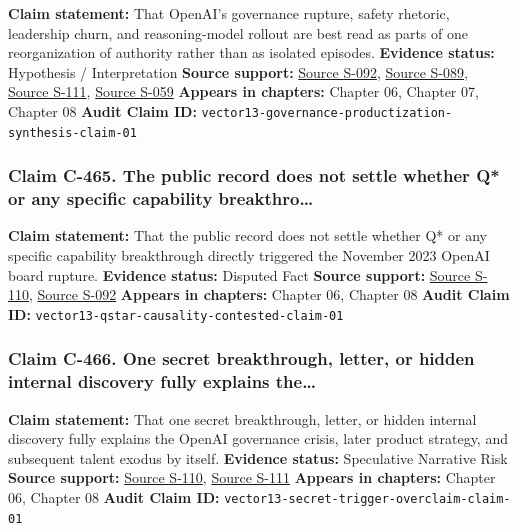 \documentclass[
  american,
  11pt,
  letterpaper,
]{article}
\begin{document}
\textbf{Claim statement:} That OpenAI's governance rupture, safety
rhetoric, leadership churn, and reasoning-model rollout are best read as
parts of one reorganization of authority rather than as isolated
episodes. \textbf{Evidence status:} Hypothesis / Interpretation
\textbf{Source support:}
\hyperref[source-s-092-openai-announces-leadership-transition]{Source
S-092},
\hyperref[source-s-089-openai-board-forms-safety-and-security-committee]{Source
S-089},
\hyperref[source-s-111-exclusive-openai-working-on-new-reasoning-technology-under-code-name-strawberry]{Source
S-111},
\hyperref[source-s-059-who-s-left-at-openai-sam-altman-consolidates-power-after-failed-coup]{Source
S-059} \textbf{Appears in chapters:} Chapter 06, Chapter 07, Chapter 08
\textbf{Audit Claim ID:}
\texttt{vector13-governance-productization-synthesis-claim-01}

\subsubsection{Claim C-465. The public record does not settle whether Q*
or any specific capability
breakthro\ldots{}}\label{claim-c-465-the-public-record-does-not-settle-whether-q-or-any-specific-capability-breakthro}

\textbf{Claim statement:} That the public record does not settle whether
Q* or any specific capability breakthrough directly triggered the
November 2023 OpenAI board rupture. \textbf{Evidence status:} Disputed
Fact \textbf{Source support:}
\hyperref[source-s-110-openai-researchers-warned-board-of-ai-breakthrough-ahead-of-ceo-ouster-sources-say]{Source
S-110},
\hyperref[source-s-092-openai-announces-leadership-transition]{Source
S-092} \textbf{Appears in chapters:} Chapter 06, Chapter 08
\textbf{Audit Claim ID:}
\texttt{vector13-qstar-causality-contested-claim-01}

\subsubsection{Claim C-466. One secret breakthrough, letter, or hidden
internal discovery fully explains
the\ldots{}}\label{claim-c-466-one-secret-breakthrough-letter-or-hidden-internal-discovery-fully-explains-the}

\textbf{Claim statement:} That one secret breakthrough, letter, or
hidden internal discovery fully explains the OpenAI governance crisis,
later product strategy, and subsequent talent exodus by itself.
\textbf{Evidence status:} Speculative Narrative Risk \textbf{Source
support:}
\hyperref[source-s-110-openai-researchers-warned-board-of-ai-breakthrough-ahead-of-ceo-ouster-sources-say]{Source
S-110},
\hyperref[source-s-111-exclusive-openai-working-on-new-reasoning-technology-under-code-name-strawberry]{Source
S-111} \textbf{Appears in chapters:} Chapter 06, Chapter 08
\textbf{Audit Claim ID:}
\texttt{vector13-secret-trigger-overclaim-claim-01}
\end{document}
